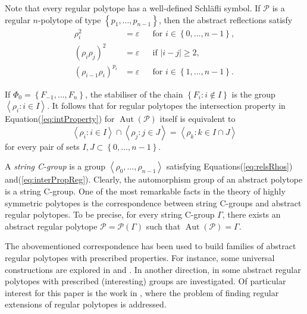 \documentclass[final]{amsart}
\theoremstyle{plain}
\theoremstyle{definition}
\theoremstyle{remark}
\numberwithin{equation}{section}
\renewcommand{\{}{\lbrace}
\renewcommand{\}}{\rbrace}
\newcommand{\cP}{\mathcal{P}}
\newcommand{\id}{\varepsilon}
\DeclareMathOperator{\aut}{Aut} \DeclareMathOperator{\autp}{\aut^{+}}
\newcommand{\baseFlag}{\Phi_{0}}
\begin{document}
Note that every regular polytope has a well-defined Schläfli symbol.
If $\cP$  is a regular $n$-polytope of type $\left\{ p_{1}, \dots, p_{n-1} \right\} $, then the abstract reflections satisfy 
\begin{equation}\label{eq:relsRhos}
	\begin{aligned} 
		\rho_{i}^{2} &= \id && \text{for } i \in \left\{ 0, \dots, n-1 \right\} ,\\
		\left( \rho_{i} \rho_{j} \right)^{2} &= \id && \text{if } |i-j| \geq 2, \\
		\left( \rho_{i-1} \rho_{i}\right)^{p_{i}} &= \id && \text{for } i \in \left\{ 1, \dots, n-1 \right\}. 
	\end{aligned}
\end{equation}

If $\baseFlag = \left\{ F_{-1}, \dots, F_{n} \right\} $, the stabiliser of the chain $\left\{ F_{i} : i \not \in I \right\} $ is the group $\left\langle \rho_{i} : i \in I \right\rangle $.
It follows that for regular polytopes the intersection property in Equation\nobreakspace \textup {(\ref {eq:intProperty})} for $\aut(\cP)$ itself is equivalent to
\begin{equation}\label{eq:interPropReg}
 \left\langle \rho_{i} : i \in I \right\rangle \cap \left\langle \rho_{j}: j \in J \right\rangle = \left\langle \rho_{k} : k \in I \cap J \right\rangle   
\end{equation}
for every pair of sets $I, J \subset \left\{ 0, \dots, n-1 \right\} $.

A \emph{string C-group} is a group $\left\langle \rho_{0}, \dots, \rho_{n-1} \right\rangle $ satisfying Equations\nobreakspace \textup {(\ref {eq:relsRhos})} and\nobreakspace  \textup {(\ref {eq:interPropReg})}. 
Clearly, the automorphism group of an abstract polytope is a string C-group.
One of the most remarkable facts in the theory of highly symmetric polytopes is the correspondence between string C-groups and abstract regular polytopes. 
To be precise, for every string C-group $\Gamma$, there exists an abstract regular polytope $\cP = \cP(\Gamma)$ such that $\aut(\cP) = \Gamma$. 



The abovementioned correspondence has been used to build families of abstract regular polytopes with prescribed properties. 
For instance, some universal constructions are explored in \cite{Schulte_1983_ArrangingRegularIncidence} and \cite{Schulte_1985_ExtensionsRegularComplexes}. 
In another direction, in \cite{CameronFernandesLeemansMixer_2017_HighestRankPolytope, FernandesLeemans_2018_CGroupsHigh, LeemansMoerenhoutOReillyRegueiro_2017_ProjectiveLinearGroups, Pellicer_2008_CprGraphsRegular} some abstract regular polytopes with prescribed (interesting) groups are investigated. 
Of particular interest for this paper is the work in \cite{Danzer_1984_RegularIncidenceComplexes, Pellicer_2009_ExtensionsRegularPolytopes, Pellicer_2010_ExtensionsDuallyBipartite}, where the problem of finding regular extensions of regular polytopes is addressed. 
\end{document}
